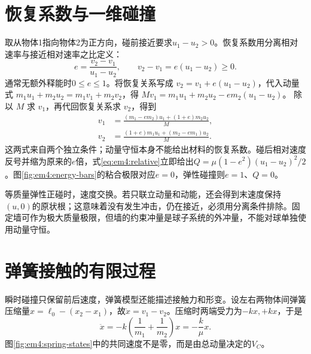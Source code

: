 \section{恢复系数与一维碰撞}

取从物体1指向物体2为正方向，碰前接近要求$u_1-u_2>0$。恢复系数用分离相对速率与接近相对速率之比定义：
\[
 e=\frac{v_2-v_1}{u_1-u_2},\qquad
 v_2-v_1=e(u_1-u_2)\ge0.
\]
通常无额外释能时$0\le e\le1$。将恢复关系写成
$v_2=v_1+e(u_1-u_2)$，代入动量式
$m_1u_1+m_2u_2=m_1v_1+m_2v_2$，得
$Mv_1=m_1u_1+m_2u_2-em_2(u_1-u_2)$。
除以 $M$ 求 $v_1$，再代回恢复关系求 $v_2$，得到
\[
\begin{aligned}
v_1&=\frac{(m_1-em_2)u_1+(1+e)m_2u_2}{M},\\
v_2&=\frac{(1+e)m_1u_1+(m_2-em_1)u_2}{M}.
\end{aligned}
\]
这两式来自两个独立条件；动量守恒本身不能给出材料的恢复系数。碰后相对速度反号并缩为原来的$e$倍，式\eqref{eq:em4:relative}立即给出$Q=\mu(1-e^2)(u_1-u_2)^2/2$。图\ref{fig:em4:energy-bars}的粘合极限对应$e=0$，弹性碰撞则$e=1$、$Q=0$。

等质量弹性正碰时，速度交换。若只联立动量和动能，还会得到末速度保持$(u,0)$的原状根；这意味着没有发生冲击，仍在接近，必须用分离条件排除。固定墙可作为极大质量极限，但墙的约束冲量是球子系统的外冲量，不能对球单独使用动量守恒。

\section{弹簧接触的有限过程}

瞬时碰撞只保留前后速度，弹簧模型还能描述接触力和形变。设左右两物体间弹簧压缩量$x=\ell_0-(x_2-x_1)$，故$\dot x=v_1-v_2$。压缩时两端受力为$-kx,+kx$，于是
\[
 \ddot x=-k\left(\frac1{m_1}+\frac1{m_2}\right)x=-\frac{k}{\mu}x.
\]
图\ref{fig:em4:spring-states}中的共同速度不是零，而是由总动量决定的$V_C$。


